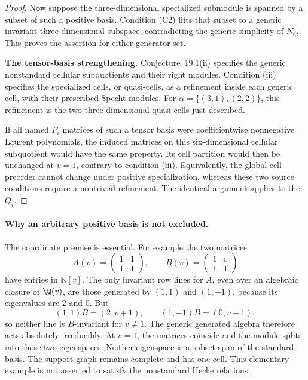 \begin{proof}
Now suppose the three-dimensional specialized submodule
is spanned by a subset of such a positive basis.
Condition (C2) lifts that subset to a generic invariant
three-dimensional subspace, contradicting the generic
simplicity of \(N_6\).
This proves the assertion for either generator set.

\par\smallskip\noindent\textbf{The tensor-basis strengthening.}\quad
Conjecture~19.1(ii) specifies the generic nonstandard
cellular subquotients and their right modules.
Condition (iii) specifies the specialized cells, or
quasi-cells, as a refinement inside each generic cell,
with their prescribed Specht modules.
For \(\alpha=\{(3,1),(2,2)\}\), this refinement is the
two three-dimensional quasi-cells just described.

If all named \(P_i\) matrices of such a tensor basis
were coefficientwise nonnegative Laurent polynomials,
the induced matrices on this six-dimensional cellular
subquotient would have the same property.
Its cell partition would then be unchanged at \(v=1\),
contrary to condition (iii).
Equivalently, the global cell preorder cannot change
under positive specialization, whereas these two source
conditions require a nontrivial refinement.
The identical argument applies to the \(Q_i\).
\end{proof}

\paragraph{Why an arbitrary positive basis is not excluded.}
The coordinate premise is essential.
For example the two matrices
\[
A(v)=\begin{pmatrix}1&1\\1&1\end{pmatrix},
\qquad
B(v)=\begin{pmatrix}1&v\\1&1\end{pmatrix}
\tag{C5}
\]
have entries in \(\mathbb N[v]\).
The only invariant row lines for \(A\), even over an
algebraic closure of \(\Q(v)\), are those generated by
\((1,1)\) and \((1,-1)\), because its eigenvalues are
\(2\) and \(0\).
But
\[
(1,1)B=(2,v+1),\qquad
(1,-1)B=(0,v-1),
\]
so neither line is \(B\)-invariant for \(v\ne1\).
The generic generated algebra therefore acts absolutely
irreducibly.
At \(v=1\), the matrices coincide and the module splits
into those two eigenspaces.
Neither eigenspace is a subset span of the standard basis.
The support graph remains complete and has one cell.
This elementary example is not asserted to satisfy the
nonstandard Hecke relations.

